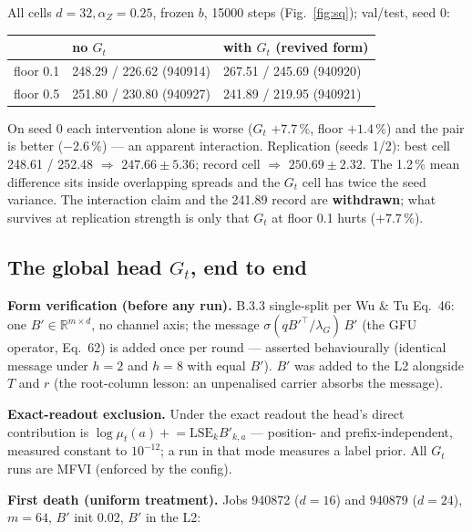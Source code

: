 \documentclass[10pt,a4paper]{article}
\newcommand{\pmm}[2]{\ensuremath{#1 \pm #2}}
\begin{document}
All cells $d{=}32, \alpha_Z{=}0.25$, frozen $b$, 15000 steps (Fig.~\ref{fig:sq}); val/test,
seed 0:

\begin{table}[h]\centering\small
\begin{tabular}{lll}
\toprule
 & no $G_t$ & with $G_t$ (revived form)\\
\midrule
floor 0.1 & 248.29 / 226.62 (940914) & 267.51 / 245.69 (940920)\\
floor 0.5 & 251.80 / 230.80 (940927) & 241.89 / 219.95 (940921)\\
\bottomrule
\end{tabular}
\end{table}

On seed 0 each intervention alone is worse ($G_t$ $+7.7\,\%$, floor $+1.4\,\%$) and the pair
is better ($-2.6\,\%$) --- an apparent interaction. Replication (seeds 1/2): best cell
248.61 / 252.48 $\Rightarrow$ \pmm{247.66}{5.36}; record cell $\Rightarrow$
\pmm{250.69}{2.32}. The 1.2\,\% mean difference sits inside overlapping spreads and the
$G_t$ cell has twice the seed variance. The interaction claim and the 241.89 record are
\textbf{withdrawn}; what survives at replication strength is only that $G_t$ at floor 0.1
hurts ($+7.7\,\%$).

\subsection{The global head $G_t$, end to end}\label{sec:gt}

\textbf{Form verification (before any run).} B.3.3 single-split per Wu \& Tu Eq.~46: one
$B' \in \mathbb{R}^{m\times d}$, no channel axis; the message
$\sigma(q B'^{\top}/\lambda_G)\, B'$ (the GFU operator, Eq.~62) is added once per round ---
asserted behaviourally (identical message under $h{=}2$ and $h{=}8$ with equal $B'$). $B'$
was added to the L2 alongside $T$ and $r$ (the root-column lesson: an unpenalised carrier
absorbs the message).

\textbf{Exact-readout exclusion.} Under the exact readout the head's direct contribution is
$\log\mu_t(a) \mathrel{+}= \mathrm{LSE}_k B'_{k,a}$ --- position- and prefix-independent,
measured constant to $10^{-12}$; a run in that mode measures a label prior. All $G_t$ runs
are MFVI (enforced by the config).

\textbf{First death (uniform treatment).} Jobs 940872 ($d{=}16$) and 940879 ($d{=}24$),
$m{=}64$, $B'$ init 0.02, $B'$ in the L2:
\end{document}
